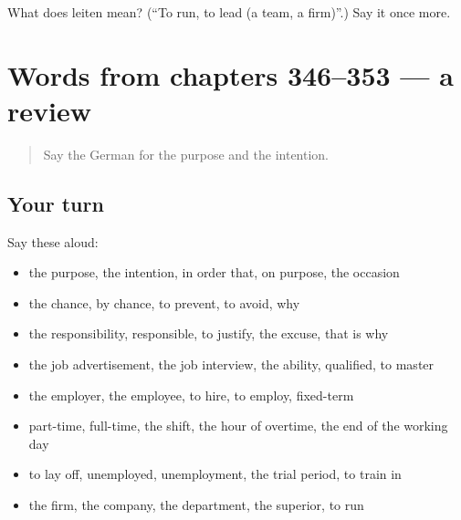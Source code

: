 \begin{tcolorbox}[breakable,colback=teal!4,colframe=teal!35!black,title={Before you move on}]
What does leiten mean? (\textquotedblleft{}To run, to lead (a team, a firm)\textquotedblright{}.) Say it once more.
\end{tcolorbox}
\section[(dialogue)]{Words from chapters 346–353 — a review}

\label{lesson:GE-R353-review-346-353}



\begin{quote}
Say the German for the purpose and the intention.
\end{quote}

\subsection*{Your turn}
Say these aloud:

\begin{itemize}
\raggedright
  \item the purpose, the intention, in order that, on purpose, the occasion
  \item the chance, by chance, to prevent, to avoid, why
  \item the responsibility, responsible, to justify, the excuse, that is why
  \item the job advertisement, the job interview, the ability, qualified, to master
  \item the employer, the employee, to hire, to employ, fixed-term
  \item part-time, full-time, the shift, the hour of overtime, the end of the working day
  \item to lay off, unemployed, unemployment, the trial period, to train in
  \item the firm, the company, the department, the superior, to run
\end{itemize}

